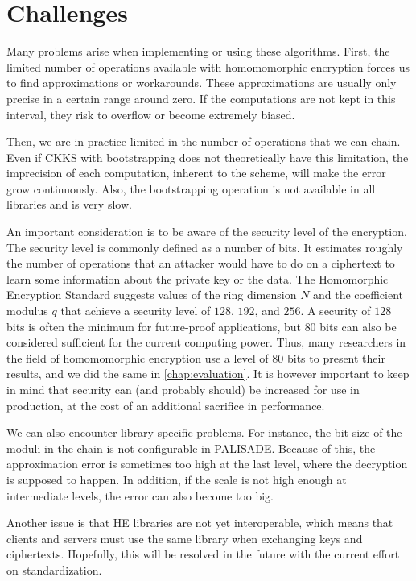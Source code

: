 \documentclass[a4paper,11pt,oneside]{report}
\begin{document}
\section{Challenges}

Many problems arise when implementing or using these algorithms. 
First, the limited number of operations available with homomomorphic encryption forces us to find approximations or workarounds. 
These approximations are usually only precise in a certain range around zero. 
If the computations are not kept in this interval, they risk to overflow or become extremely biased.

Then, we are in practice limited in the number of operations that we can chain. 
Even if CKKS with bootstrapping does not theoretically have this limitation, the imprecision of each computation, inherent to the scheme, will make the error grow continuously.
Also, the bootstrapping operation is not available in all libraries and is very slow.

An important consideration is to be aware of the security level of the encryption. 
The security level is commonly defined as a number of bits. 
It estimates roughly the number of operations that an attacker would have to do on a ciphertext to learn some information about the private key or the data.
The Homomorphic Encryption Standard \cite{albrecht_homomorphic_2021} suggests values of the ring dimension $N$ and the coefficient modulus $q$ that achieve a security level of $128$, $192$, and $256$. 
A security of $128$ bits is often the minimum for future-proof applications, but $80$ bits can also be considered sufficient for the current computing power.
Thus, many researchers in the field of homomomorphic encryption use a level of $80$ bits to present their results, and we did the same in \autoref{chap:evaluation}.
It is however important to keep in mind that security can (and probably should) be increased for use in production, at the cost of an additional sacrifice in performance.

We can also encounter library-specific problems. 
For instance, the bit size of the moduli in the chain is not configurable in PALISADE. 
Because of this, the approximation error is sometimes too high at the last level, where the decryption is supposed to happen.
In addition, if the scale is not high enough at intermediate levels, the error can also become too big.

Another issue is that HE libraries are not yet interoperable, which means that clients and servers must use the same library when exchanging keys and ciphertexts. 
Hopefully, this will be resolved in the future with the current effort on standardization.
\end{document}
